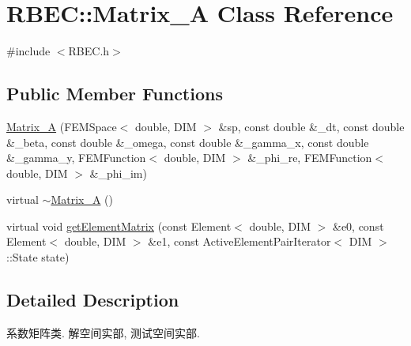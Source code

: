 \hypertarget{classRBEC_1_1Matrix__A}{\section{\-R\-B\-E\-C\-:\-:\-Matrix\-\_\-\-A \-Class \-Reference}
\label{classRBEC_1_1Matrix__A}
}


{\ttfamily \#include $<$\-R\-B\-E\-C.\-h$>$}

\subsection*{\-Public \-Member \-Functions}
\begin{DoxyCompactItemize}
\item 
\hyperlink{classRBEC_1_1Matrix__A_ad2af8f38793cd61aa4123aa44e8549ca}{\-Matrix\-\_\-\-A} (\-F\-E\-M\-Space$<$ double, \-D\-I\-M $>$ \&sp, const double \&\-\_\-dt, const double \&\-\_\-beta, const double \&\-\_\-omega, const double \&\-\_\-gamma\-\_\-x, const double \&\-\_\-gamma\-\_\-y, \-F\-E\-M\-Function$<$ double, \-D\-I\-M $>$ \&\-\_\-phi\-\_\-re, \-F\-E\-M\-Function$<$ double, \-D\-I\-M $>$ \&\-\_\-phi\-\_\-im)
\item 
virtual \hyperlink{classRBEC_1_1Matrix__A_a144736582d8cf84718e18a28d044c94b}{$\sim$\-Matrix\-\_\-\-A} ()
\item 
virtual void \hyperlink{classRBEC_1_1Matrix__A_ac2a9785b7efee67b345e09c36732e1d5}{get\-Element\-Matrix} (const \-Element$<$ double, \-D\-I\-M $>$ \&e0, const \-Element$<$ double, \-D\-I\-M $>$ \&e1, const \-Active\-Element\-Pair\-Iterator$<$ \-D\-I\-M $>$\-::\-State state)
\end{DoxyCompactItemize}


\subsection{\-Detailed \-Description}
系数矩阵类. 解空间实部, 测试空间实部. 

